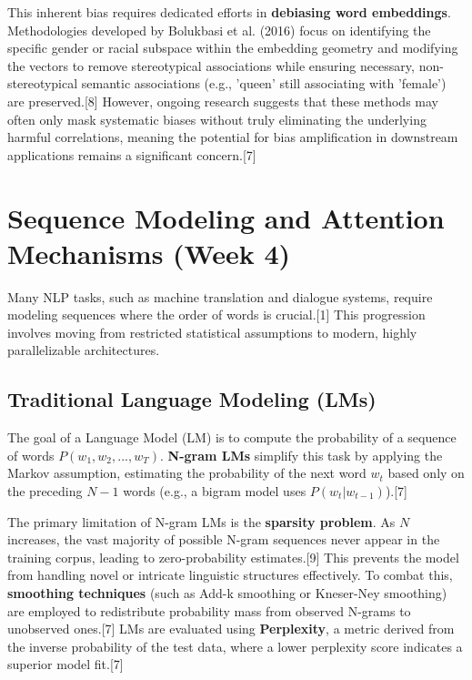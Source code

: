 \documentclass{article}
\begin{document}
This inherent bias requires dedicated efforts in \textbf{debiasing word embeddings}. Methodologies developed by Bolukbasi et al. (2016) focus on identifying the specific gender or racial subspace within the embedding geometry and modifying the vectors to remove stereotypical associations while ensuring necessary, non-stereotypical semantic associations (e.g., 'queen' still associating with 'female') are preserved.[8] However, ongoing research suggests that these methods may often only mask systematic biases without truly eliminating the underlying harmful correlations, meaning the potential for bias amplification in downstream applications remains a significant concern.[7]

\section{Sequence Modeling and Attention Mechanisms (Week 4)}

Many NLP tasks, such as machine translation and dialogue systems, require modeling sequences where the order of words is crucial.[1] This progression involves moving from restricted statistical assumptions to modern, highly parallelizable architectures.

\subsection{Traditional Language Modeling (LMs)}

The goal of a Language Model (LM) is to compute the probability of a sequence of words $P(w_1, w_2,..., w_T)$. \textbf{N-gram LMs} simplify this task by applying the Markov assumption, estimating the probability of the next word $w_t$ based only on the preceding $N-1$ words (e.g., a bigram model uses $P(w_t|w_{t-1})$).[7]

The primary limitation of N-gram LMs is the \textbf{sparsity problem}. As $N$ increases, the vast majority of possible N-gram sequences never appear in the training corpus, leading to zero-probability estimates.[9] This prevents the model from handling novel or intricate linguistic structures effectively. To combat this, \textbf{smoothing techniques} (such as Add-k smoothing or Kneser-Ney smoothing) are employed to redistribute probability mass from observed N-grams to unobserved ones.[7] LMs are evaluated using \textbf{Perplexity}, a metric derived from the inverse probability of the test data, where a lower perplexity score indicates a superior model fit.[7]
\end{document}
